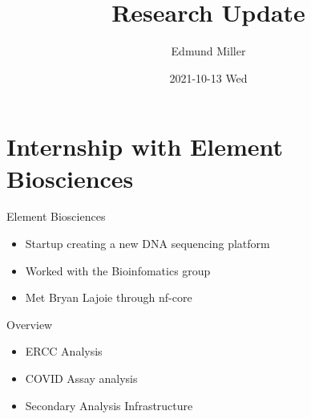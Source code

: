 \documentclass[bigger]{beamer}
\author{Edmund Miller}
\date{2021-10-13 Wed}
\title{Research Update}
\begin{document}
\maketitle

\section{Internship with Element Biosciences}
\label{sec:orgb717863}

\begin{frame}[label={sec:orga69606c}]{Element Biosciences}
\begin{itemize}
\item Startup creating a new DNA sequencing platform
\item Worked with the Bioinfomatics group
\item Met Bryan Lajoie through nf-core
\end{itemize}
\end{frame}

\begin{frame}[label={sec:org0dc6ff7}]{Overview}
\begin{itemize}
\item ERCC Analysis
\item COVID Assay analysis
\item Secondary Analysis Infrastructure
\end{itemize}
\end{frame}
\end{document}
